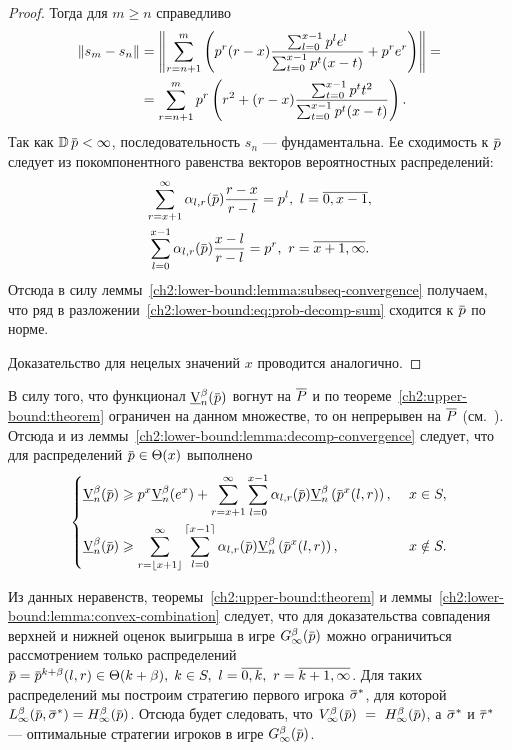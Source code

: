 {\begin{proof}
  Тогда для $m \geqslant n$ справедливо
  \begin{align*}
    \left\lVert s_m-s_n\right\rVert
    &= \left\lVert
      \sum_{r=n+1}^m \left(
      p^r (r-x) \frac{\sum_{l=0}^{x-1} p^l e^l}{\sum_{t=0}^{x-1} p^t (x-t)} + p^r e^r
      \right)\right\rVert =\\
    &= \sum_{r=n+1}^m p^r \left(
      r^2 + (r-x) \frac{\sum_{t=0}^{x-1} p^t t^2}{\sum_{t=0}^{x-1} p^t (x-t)}
      \right).
  \end{align*}
  Так как $\D \p < \infty$, последовательность $s_n$ --- фундаментальна.
  Ее сходимость к $\p$ следует из покомпонентного равенства векторов вероятностных распределений:
  \begin{gather*}
    \sum_{r=x+1}^\infty \alpha_{l,r}(\p) \frac{r-x}{r-l} = p^l,\ l = \overline{0, x-1}, \\
    \sum_{l=0}^{x-1} \alpha_{l,r}(\p) \frac{x-l}{r-l} = p^r,\ r = \overline{x+1, \infty}.
  \end{gather*}
  Отсюда в силу леммы~\ref{ch2:lower-bound:lemma:subseq-convergence} получаем, что ряд в разложении~\eqref{ch2:lower-bound:eq:prob-decomp-sum} сходится к $\p$ по норме.

  Доказательство для нецелых значений $x$ проводится аналогично.
\end{proof}

В силу того, что функционал $\LowV(\p)$ вогнут на $\overline{P}$ и по теореме~\ref{ch2:upper-bound:theorem} ограничен на данном множестве, то он непрерывен на $\overline{P}$ (см.~\cite[Теорема 1.7.1]{polovinkin04}).
Отсюда и из леммы~\ref{ch2:lower-bound:lemma:decomp-convergence} следует, что для распределений $\p \in \Theta(x)$ выполнено
\begin{equation*}
  \left\{
  \begin{aligned}
    \LowV(\p) &\geqslant
      p^x \LowV(e^x) + \sum_{r=x+1}^\infty \sum_{l=0}^{x-1} \alpha_{l,r}(\p) \LowV \left( \p^x(l, r) \right),&\ x \in S,\\
    \LowV(\p) &\geqslant 
      \sum_{r=\floor{x+1}}^\infty \sum_{l=0}^{\ceil{x-1}} \alpha_{l,r}(\p) \LowV \left( \p^x(l, r) \right),&\ x \notin S.
  \end{aligned}
  \right.
\end{equation*}

Из данных неравенств, теоремы~\ref{ch2:upper-bound:theorem} и леммы~\ref{ch2:lower-bound:lemma:convex-combination} следует, что для доказательства совпадения верхней и нижней оценок выигрыша в игре $\theG[\infty](\p)$ можно ограничиться рассмотрением только распределений %
$\p = \p^{k+\beta}(l, r) \in \Theta(k + \beta), \; k \in S,\ l = \overline{0, k},\ r = \overline{k+1, \infty}$.
Для таких распределений мы построим стратегию первого игрока $\sigmav^*$, для которой $\Low[\infty](\p, \sigmav^*) = \High[\infty](\p)$.
Отсюда будет следовать, что $\V[\infty](\p)~=~\High[\infty](\p)$, а $\sigmav^*$ и $\tauv^*$ --- оптимальные стратегии игроков в игре $\theG[\infty](\p)$.

}
